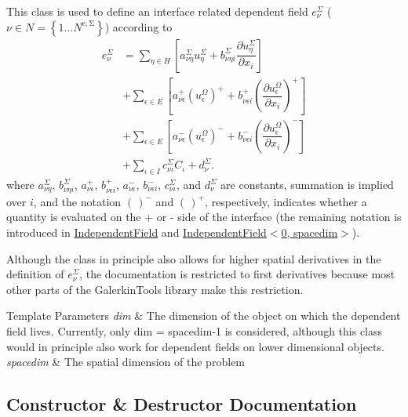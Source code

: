 This class is used to define an interface related dependent field $e^\Sigma_\nu$ ( $\nu \in N=\left\{1 \hdots N^\mathrm{e,\Sigma}\right\}$) according to \begin{equation*} \begin{split} e^\Sigma_\nu &= \sum_{\eta \in H} \left[ a^\Sigma_{\nu\eta} u^\Sigma_\eta + b^\Sigma_{\nu\eta i} \dfrac{\partial u^\Sigma_\eta}{\partial x_i} \right]\\ & + \sum_{\epsilon \in E} \left[ a^+_{\nu\epsilon} (u^\Omega_\epsilon)^+ + b^+_{\nu\epsilon i} \left(\dfrac{\partial u^\Omega_\epsilon}{\partial x_i}\right)^+ \right]\\ & + \sum_{\epsilon \in E} \left[ a^-_{\nu\epsilon} (u^\Omega_\epsilon)^- + b^-_{\nu\epsilon i} \left(\dfrac{\partial u^\Omega_\epsilon}{\partial x_i}\right)^- \right]\\ & + \sum_{\iota \in I}c^\Sigma_{\nu\iota} C_\iota + d^\Sigma_\nu. \end{split} \end{equation*} where $a^\Sigma_{\nu\eta}$, $b^\Sigma_{\nu\eta i}$, $a^+_{\nu\epsilon}$, $b^+_{\nu\epsilon i}$, $a^-_{\nu\epsilon}$, $b^-_{\nu\epsilon i}$, $c^\Sigma_{\nu\iota}$, and $d^\Sigma_\nu$ are constants, summation is implied over $i$, and the notation $(\,)^-$ and $(\,)^+$, respectively, indicates whether a quantity is evaluated on the + or -\/ side of the interface (the remaining notation is introduced in \hyperlink{class_independent_field}{Independent\+Field} and \hyperlink{class_independent_field_3_010_00_01spacedim_01_4}{Independent\+Field$<$0, spacedim$>$}).

Although the class in principle also allows for higher spatial derivatives in the definition of $e^\Sigma_\nu$, the documentation is restricted to first derivatives because most other parts of the Galerkin\+Tools library make this restriction.


\begin{DoxyTemplParams}{Template Parameters}
{\em dim} & The dimension of the object on which the dependent field lives. Currently, only {\ttfamily dim} = {\ttfamily spacedim-\/1} is considered, although this class would in principle also work for dependent fields on lower dimensional objects.\\
\hline
{\em spacedim} & The spatial dimension of the problem \\
\hline
\end{DoxyTemplParams}


\subsection{Constructor \& Destructor Documentation}
